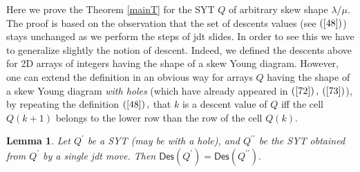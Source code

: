 \documentclass[12pt]{article}%
\newtheorem{lemma}[theorem]{Lemma}
\begin{document}
Here we prove the Theorem \ref{mainT} for the SYT $Q$ of arbitrary skew shape
$\lambda/\mu.$ The proof is based on the observation that the set of descents
values (see $\left(  \ref{48}\right)  $) stays unchanged as we perform the
steps of jdt slides. In order to see this we have to generalize slightly the
notion of descent. Indeed, we defined the descents above for 2D arrays of
integers having the shape of a skew Young diagram. However, one can extend the
definition in an obvious way for arrays $Q$ having the shape of a skew Young
diagram \textit{with holes }(which have already appeared in $\left(
\ref{72}\right)  ,$ $\left(  \ref{73}\right)  $)\textit{,} by repeating the
definition $\left(  \ref{48}\right)  ,$ that $k$ is a descent value of $Q$ iff
the cell $Q\left(  k+1\right)  $ belongs to the lower row than the row of the
cell $Q\left(  k\right)  .$

\begin{lemma}
Let $Q^{\prime}$ be a SYT (may be with a hole), and $Q^{\prime\prime}$ be the
SYT obtained from $Q^{\prime}$ by a single jdt move. Then $\mathsf{Des}\left(
Q^{\prime}\right)  =\mathsf{Des}\left(  Q^{\prime\prime}\right)  .$
\end{lemma}
\end{document}

